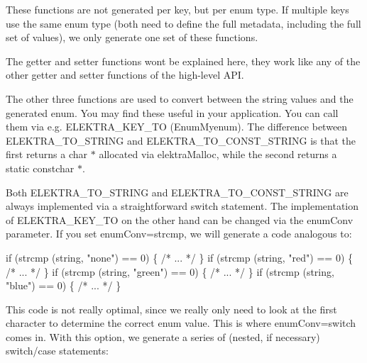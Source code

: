 These functions are not generated per key, but per enum type. If multiple keys use the same enum type (both need to define the full metadata, including the full set of values), we only generate one set of these functions.

The getter and setter functions won\textquotesingle{}t be explained here, they work like any of the other getter and setter functions of the high-\/level A\+PI.

The other three functions are used to convert between the string values and the generated {\ttfamily enum}. You may find these useful in your application. You can call them via e.\+g. {\ttfamily E\+L\+E\+K\+T\+R\+A\+\_\+\+K\+E\+Y\+\_\+\+TO (Enum\+Myenum)}. The difference between {\ttfamily E\+L\+E\+K\+T\+R\+A\+\_\+\+T\+O\+\_\+\+S\+T\+R\+I\+NG} and {\ttfamily E\+L\+E\+K\+T\+R\+A\+\_\+\+T\+O\+\_\+\+C\+O\+N\+S\+T\+\_\+\+S\+T\+R\+I\+NG} is that the first returns a {\ttfamily char $\ast$} allocated via {\ttfamily elektra\+Malloc}, while the second returns a static {\ttfamily constchar $\ast$}.

Both {\ttfamily E\+L\+E\+K\+T\+R\+A\+\_\+\+T\+O\+\_\+\+S\+T\+R\+I\+NG} and {\ttfamily E\+L\+E\+K\+T\+R\+A\+\_\+\+T\+O\+\_\+\+C\+O\+N\+S\+T\+\_\+\+S\+T\+R\+I\+NG} are always implemented via a straightforward {\ttfamily switch} statement. The implementation of {\ttfamily E\+L\+E\+K\+T\+R\+A\+\_\+\+K\+E\+Y\+\_\+\+TO} on the other hand can be changed via the {\ttfamily enum\+Conv} parameter. If you set {\ttfamily enum\+Conv=strcmp}, we will generate a code analogous to\+:


\begin{DoxyCode}
\textcolor{keywordflow}{if} (strcmp (\textcolor{keywordtype}{string}, \textcolor{stringliteral}{"none"}) == 0) \{ \textcolor{comment}{/* ... */} \}
\textcolor{keywordflow}{if} (strcmp (\textcolor{keywordtype}{string}, \textcolor{stringliteral}{"red"}) == 0) \{ \textcolor{comment}{/* ... */} \}
\textcolor{keywordflow}{if} (strcmp (\textcolor{keywordtype}{string}, \textcolor{stringliteral}{"green"}) == 0) \{ \textcolor{comment}{/* ... */} \}
\textcolor{keywordflow}{if} (strcmp (\textcolor{keywordtype}{string}, \textcolor{stringliteral}{"blue"}) == 0) \{ \textcolor{comment}{/* ... */} \}
\end{DoxyCode}


This code is not really optimal, since we really only need to look at the first character to determine the correct enum value. This is where {\ttfamily enum\+Conv=switch} comes in. With this option, we generate a series of (nested, if necessary) switch/case statements\+:


